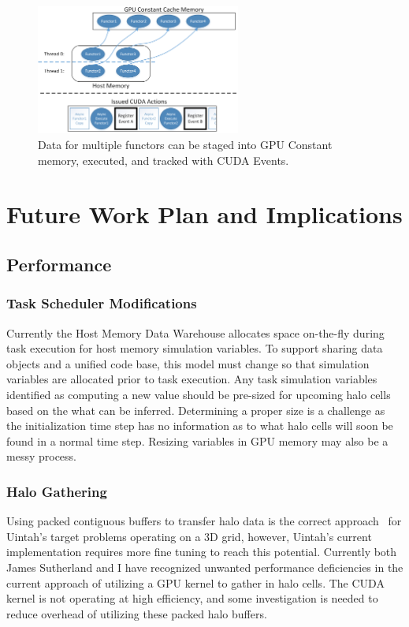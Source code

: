 \documentclass[12pt]{article}
\begin{document}
\begin{figure}
	\centering
	\includegraphics[width=0.60\textwidth]{figures/Kokkos_constant_cache_new.png}
	\caption{Data for multiple functors can be staged into GPU Constant memory, executed, and tracked with CUDA Events.   }
	\label{fig:kokkos-constant-cache-new}
\end{figure}


\section{Future Work Plan and Implications}
\label{ch:workplan}

\subsection{Performance}
\label{ch:workplan-performance}
\subsubsection{Task Scheduler Modifications}
\label{ch:task-scheduler-modification}
Currently the Host Memory Data Warehouse allocates space on-the-fly during task execution for host memory simulation variables.  To support sharing data objects and a unified code base, this model must change so that simulation variables are allocated prior to task execution.   Any task simulation variables identified as computing a new value should be pre-sized for upcoming halo cells based on the what can be inferred.  Determining a proper size is a challenge as the initialization time step has no information as to what halo cells will soon be found in a normal time step.  Resizing variables in GPU memory may also be a messy process.  

\subsubsection{Halo Gathering}
\label{ch:workplan-halo-gathering}
Using packed contiguous buffers to transfer halo data is the correct approach~\cite{ijpp16} for Uintah's target problems operating on a 3D grid, however, Uintah's current implementation requires more fine tuning to reach this potential. Currently both James Sutherland and I have recognized unwanted performance deficiencies in the current approach of utilizing a GPU kernel to gather in halo cells.   The CUDA kernel is not operating at high efficiency, and some investigation is needed to reduce overhead of utilizing these packed halo buffers. 
\end{document}
